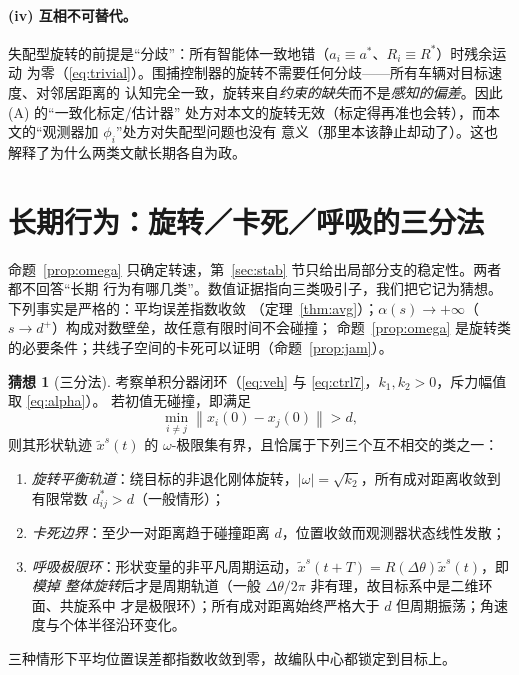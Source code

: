 \documentclass[11pt,a4paper]{ctexart}
\theoremstyle{plain}
\theoremstyle{definition}
\newtheorem{conjecture}{猜想}
\theoremstyle{remark}
\newcommand{\ts}{\tilde{x}^{s}}
\newcommand{\norm}[1]{\left\|#1\right\|}
\begin{document}
\paragraph{(iv) 互相不可替代。}
失配型旋转的前提是“分歧”：所有智能体一致地错（$a_i\equiv a^*$、$R_i\equiv R^*$）时残余运动
为零（\eqref{eq:trivial}）。围捕控制器的旋转不需要任何分歧——所有车辆对目标速度、对邻居距离的
认知完全一致，旋转来自\emph{约束的缺失}而不是\emph{感知的偏差}。因此 (A) 的“一致化标定/估计器”
处方对本文的旋转无效（标定得再准也会转），而本文的“观测器加 $\phi_i$”处方对失配型问题也没有
意义（那里本该静止却动了）。这也解释了为什么两类文献长期各自为政。



\section{长期行为：旋转／卡死／呼吸的三分法}
\label{sec:trichotomy}

命题~\ref{prop:omega} 只确定转速，第~\ref{sec:stab} 节只给出局部分支的稳定性。两者都不回答“长期
行为有哪几类”。数值证据指向三类吸引子，我们把它记为猜想。下列事实是严格的：平均误差指数收敛
（定理~\ref{thm:avg}）；$\alpha(s)\to+\infty$（$s\to d^+$）构成对数壁垒，故任意有限时间不会碰撞；
命题~\ref{prop:omega} 是旋转类的必要条件；共线子空间的卡死可以证明（命题~\ref{prop:jam}）。

\begin{conjecture}[三分法]
\label{conj:tri}
考察单积分器闭环（\eqref{eq:veh} 与 \eqref{eq:ctrl7}，$k_1,k_2>0$，斥力幅值取 \eqref{eq:alpha}）。
若初值无碰撞，即满足
\begin{equation*}
  \min_{i\ne j}\norm{x_i(0)-x_j(0)}>d ,
\end{equation*}
则其形状轨迹 $\ts(t)$ 的 $\omega$-极限集有界，且恰属于下列三个互不相交的类之一：
\begin{enumerate}[leftmargin=2.2em]
  \item \emph{旋转平衡轨道}：绕目标的非退化刚体旋转，$|\omega|=\sqrt{k_2}$，所有成对距离收敛到
        有限常数 $d_{ij}^*>d$（一般情形）；
  \item \emph{卡死边界}：至少一对距离趋于碰撞距离 $d$，位置收敛而观测器状态线性发散；
  \item \emph{呼吸极限环}：形状变量的非平凡周期运动，$\ts(t+T)=R(\Delta\theta)\ts(t)$，即\emph{模掉
        整体旋转}后才是周期轨道（一般 $\Delta\theta/2\pi$ 非有理，故目标系中是二维环面、共旋系中
        才是极限环）；所有成对距离始终严格大于 $d$ 但周期振荡；角速度与个体半径沿环变化。
\end{enumerate}
三种情形下平均位置误差都指数收敛到零，故编队中心都锁定到目标上。
\end{conjecture}
\end{document}
